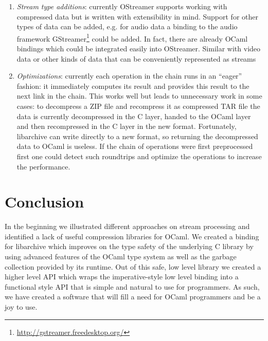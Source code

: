 \documentclass[parskip=half]{scrreprt}
\begin{document}
\begin{enumerate}
  \item \emph{Stream type additions}: currently OStreamer supports working with
    compressed data but is written with extensibility in mind. Support for
    other types of data can be added, e.g. for audio data a binding to the
    audio framework GStreamer\footnote{\url{http://gstreamer.freedesktop.org/}}
    could be added. In fact, there are already OCaml bindings which could be
    integrated easily into OStreamer. Similar with video data or other kinds of
    data that can be conveniently represented as streams
  \item \emph{Optimizations}: currently each operation in the chain runs in an
    \enquote{eager} fashion: it immediately computes its result and provides
    this result to the next link in the chain. This works well but leads to
    unnecessary work in some cases: to decompress a ZIP file and recompress it
    as compressed TAR file the data is currently decompressed in the C layer,
    handed to the OCaml layer and then recompressed in the C layer in the new
    format. Fortunately, libarchive can write directly to a new format, so
    returning the decompressed data to OCaml is useless.  If the chain of
    operations were first preprocessed first one could detect such roundtrips
    and optimize the operations to increase the performance.
\end{enumerate}

\section{Conclusion}
\label{sec:conclusion}


In the beginning we illustrated different approaches on stream processing and
identified a lack of useful compression libraries for OCaml. We created a
binding for libarchive which improves on the type safety of the underlying C
library by using advanced features of the OCaml type system as well as the
garbage collection provided by its runtime. Out of this safe, low level library
we created a higher level API which wraps the imperative-style low level
binding into a functional style API that is simple and natural to use for
programmers. As such, we have created a software that will fill a need for
OCaml programmers and be a joy to use.
\end{document}
